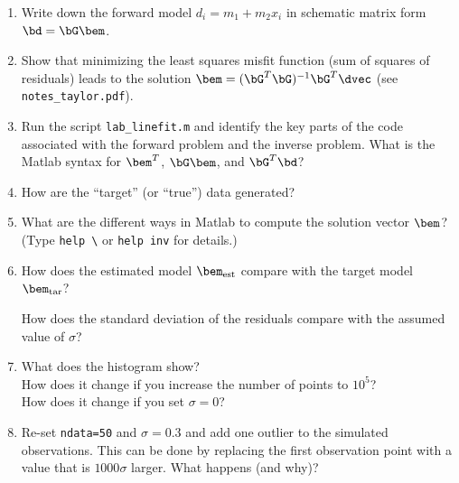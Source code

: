 \documentclass[11pt,titlepage,fleqn]{article}
\begin{document}
\begin{enumerate}
\item Write down the forward model $d_i = m_1 + m_2 x_i$ in schematic matrix form $\bd = \bG\bem$.

\vertgap
\vertgap

\item Show that minimizing the least squares misfit function (\ie sum of squares of residuals) leads to the solution $\bem = (\bG^T\bG)^{-1}\bG^T\dvec$ (see \verb+notes_taylor.pdf+).

\vertgap
\vertgap
\vertgap

\item Run the script \verb+lab_linefit.m+ and identify the key parts of the code associated with the forward problem and the inverse problem. What is the Matlab syntax for $\bem^T$, $\bG\bem$, and $\bG^T\bd$?

\vertgap

\item How are the ``target'' (or ``true'') data generated?

\vertgap

\item What are the different ways in Matlab to compute the solution vector $\bem$? \\
(Type \verb+help \+ or \verb+help inv+ for details.)

\vertgap

\item How does the estimated model $\bem_{\rm est}$ compare with the target model $\bem_{\rm tar}$?

\vertgap

How does the standard deviation of the residuals compare with the assumed value of $\sigma$?

\vertgap

\item What does the histogram show? \\
How does it change if you increase the number of points to $10^5$? \\
How does it change if you set $\sigma = 0$?

\vertgap

\item Re-set \verb+ndata=50+ and $\sigma = 0.3$ and add one outlier to the simulated observations. This can be done by replacing the first observation point with a value that is $1000\sigma$ larger. What happens (and why)?

\vertgap


\end{enumerate}
\end{document}
